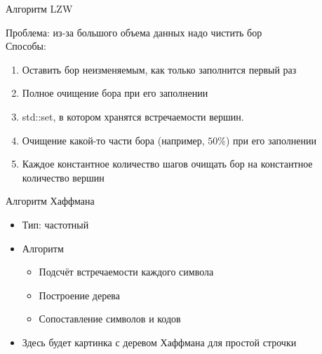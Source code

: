 \documentclass[12pt]{beamer}
\begin{document}
\begin{frame}{Алгоритм LZW}

    Проблема: из-за большого объема данных надо чистить бор \\

    Способы:

    \begin{enumerate}

        \item <1-> Оставить бор неизменяемым, как только заполнится первый раз

        \item <2-> Полное очищение бора при его заполнении

        \item <3-> std::set, в котором хранятся встречаемости вершин.
        
        \item <4-> Очищение какой-то части бора (например, $50\%$) при его
        заполнении

        \item <5-> Каждое константное количество шагов очищать бор на 
        константное количество вершин

    \end{enumerate}
    
\end{frame}


\begin{frame}{Алгоритм Хаффмана}

    \begin{itemize}

        \item Тип: частотный
        
        \item Алгоритм
        
        \begin{itemize}

            \item <1-> Подсчёт встречаемости каждого символа

            \item <2-> Построение дерева

            \item <3-> Сопоставление символов и кодов

        \end{itemize}

        \item Здесь будет картинка с деревом Хаффмана для простой строчки  

    \end{itemize}

\end{frame}
\end{document}
